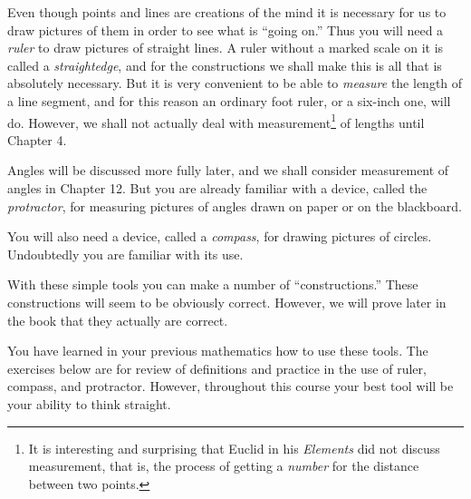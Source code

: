 \documentclass[11pt]{book}
\begin{document}
\setcounter{footnote}{0}
Even though points and lines are creations of the mind it is necessary for us to
draw pictures of them in order to see what is ``going on.'' Thus you will need a
\emph{ruler} to draw pictures of straight lines. A ruler without a marked scale
on it is called a \emph{straightedge}, and for the constructions we shall make
this is all that is absolutely necessary. But it is very convenient to be able to
\emph{measure} the length of a line segment, and for this reason an ordinary foot
ruler, or a six-inch one, will do. However, we shall not actually deal with
measurement\footnote{It is interesting and surprising that Euclid in his
\emph{Elements} did not discuss measurement, that is, the process of getting a
\emph{number} for the distance between two points.}
of lengths until Chapter 4.

Angles will be discussed more fully later, and we shall consider measurement of
angles in Chapter 12. But you are already familiar with a device, called the
\emph{protractor}, for measuring pictures of angles drawn on paper or on the
blackboard.

You will also need a device, called a \emph{compass}, for drawing pictures of
circles. Undoubtedly you are familiar with its use.

With these simple tools you can make a number of ``constructions.'' These
constructions will seem to be obviously correct. However, we will prove later in
the book that they actually are correct.

You have learned in your previous mathematics how to use these tools. The
exercises below are for review of definitions and practice in the use of ruler,
compass, and protractor. However, throughout this course your best tool will be
your ability to think straight.
\end{document}
